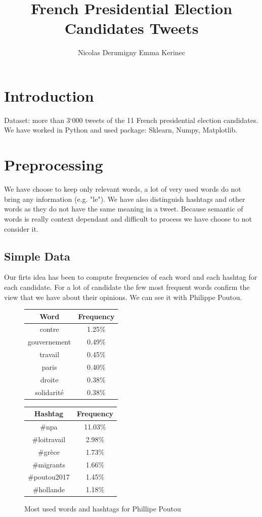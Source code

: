 \documentclass[a4paper]{article}
\title{French Presidential Election Candidates Tweets}
\author{Nicolas Derumigny Emma Kerinec \\ }
\theoremstyle{definition}
\begin{document}
\makeatletter
\begin{titlepage}
\end{titlepage}

\section{Introduction}

Dataset: more than 3`000 tweets of the 11 French presidential election candidates.
We have worked in Python and used package: Sklearn, Numpy, Matplotlib.

\section{Preprocessing}
We have choose to keep only relevant words, a lot of very used words do not bring any information (e.g. "le").
We have also distinguish hashtags and other words as they do not have the same meaning in a tweet.
Because semantic of words is really context dependant and difficult to process we have choose to not consider it. 
 
\subsection{Simple Data}
Our firts idea has been to compute frequencies of each word and each hashtag for each candidate.
For a lot of candidate the few most frequent words confirm the view that we have about their opinions. 
We can see it with Philippe Poutou.


\begin{figure}
\label{fig:image1}
\begin{center}
\begin{multicols}{2}
\begin{tabular}{ | c | c |}
\hline Word & Frequency\\
\hline
contre & 1.25\%\\
gouvernement & 0.49\%\\
travail & 0.45\%\\
paris & 0.40\%\\
droite & 0.38\%\\
solidarité &  0.38\%\\
\hline
\end{tabular}

\begin{tabular}{ | c | c |}
\hline Hashtag & Frequency\\
\hline
\#npa & 11.03\%\\
\#loitravail & 2.98\%\\
\#grèce & 1.73\%\\
\#migrants & 1.66\%\\
\#poutou2017 & 1.45\%\\
\#hollande & 1.18\%\\
\hline
\end{tabular}
\end{multicols}
\bigskip
\caption{Most used words and hashtags for Phillipe Poutou}
\end{center}
\end{figure}
\end{document}
